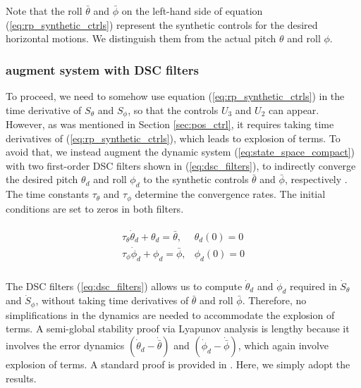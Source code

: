 \documentclass[journal,11pt,onecolumn,draftclsnofoot,]{IEEEtran}
\begin{document}
Note that the roll $\bar{\theta}$ and $\bar{\phi}$ on the left-hand side of equation (\ref{eq:rp_synthetic_ctrls}) represent the synthetic controls for the desired horizontal motions. We distinguish them from the actual pitch $\theta$ and roll $\phi$.


\subsubsection{augment system with DSC filters}
To proceed, we need to somehow use equation (\ref{eq:rp_synthetic_ctrls}) in the time derivative of $S_\theta$ and $S_\phi$, so that the controls $U_3$ and $U_2$ can appear. However, as was mentioned in Section \ref{sec:pos_ctrl}, it requires taking time derivatives of (\ref{eq:rp_synthetic_ctrls}), which leads to explosion of terms. To avoid that, we instead augment the dynamic system (\ref{eq:state_space_compact}) with two first-order DSC filters shown in (\ref{eq:dsc_filters}), to indirectly converge the desired pitch $\theta_d$ and roll $\phi_d$ to the synthetic controls $\bar{\theta}$ and $\bar{\phi}$, respectively \cite{song2011dynamic}. The time constants $\tau_\theta$ and $\tau_\phi$ determine the convergence rates. The initial conditions are set to zeros in both filters. 

\begin{equation}
\label{eq:dsc_filters}
\begin{split}
\begin{matrix}
\tau _\theta \dot{\theta}_d+\theta_d = \bar{\theta}, & \theta_d(0) = 0 \\
\tau _\phi \dot{\phi}_d+\phi_d = \bar{\phi}, &             \phi_d(0) = 0\\
\end{matrix}
\end{split}
\end{equation}

The DSC filters (\ref{eq:dsc_filters}) allows us to compute $\dot{\theta}_d$ and $\dot{\phi}_d$ required in $\dot{S}_\theta$ and $\dot{S}_\phi$, without taking time derivatives of $\bar{\theta}$ and roll $\bar{\phi}$. Therefore, no simplifications in the dynamics are needed to accommodate the explosion of terms. A semi-global stability proof via Lyapunov analysis is lengthy because it involves the error dynamics  $(\dot{\theta}_d - \dot{\bar{\theta}})$ and $(\dot{\phi}_d - \dot{\bar{\phi}})$, which again involve explosion of terms. A standard proof is provided in \cite{song2011dynamic}. Here, we simply adopt the results.
\end{document}
